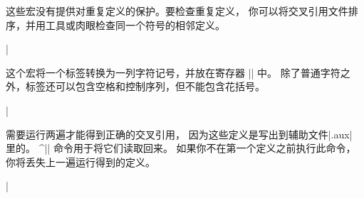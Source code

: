 {{%
这些宏没有提供对重复定义的保护。要检查重复定义，
你可以将交叉引用文件排序，并用工具或肉眼检查同一个符号的相邻定义。

\csdisplay
\newif\ifxrefwarning  \xrefwarningtrue
\def\xrdef#1{\begingroup
   \xrlabel{#1}%
   \edef\@wr{\@writexrdef{\the\@xrlabeltoks}}%
   \@wr
   \endgroup \ignorespaces}%
\def\@writexrdef#1{\write\reffile{%
     \string\gdef
        \expandafter\string\csname#1\endcsname
        {\noexpand\folio}\percentchar}}%
\def\xrefnumber#1{%
   \xrlabel{#1}%
   \toks0 =
      \expandafter{\csname\the\@xrlabeltoks\endcsname}%
   \expandafter \ifx\the\toks0\relax
      \ifxrefwarning \message{Undefined label
         `\tokstostring{#1}'.}\fi
      {\let\spacesub = \space
       \expandafter\xdef\the\toks0
          {`{\tt \tokstostring{#1}}'}}\fi
   \the\toks0}%
\def\xref#1{p.\thinspace\xrefnumber{#1}}%
\def\xrefn#1{\xrefnumber{#1}}%
|

这个宏将一个标签转换为一列字符记号，并放在寄存器 || 中。
除了普通字符之外，标签还可以包含空格和控制序列，但不能包含花括号。

\csdisplay
\newtoks\@xrlabeltoks
\def\xrlabel#1{\begingroup
      \escapechar = `\_ \edef\tts{\tokstostring{#1_}}%
      \global\@xrlabeltoks = \expandafter{\tts}%
   \endgroup}%
|

需要运行两遍才能得到正确的交叉引用，
因为这些定义是写出到辅助文件|\jobname.aux| 里的。
\pix^|\readreffile| 命令用于将它们读取回来。
如果你不在第一个定义之前执行此命令，你将丢失上一遍运行得到的定义。

\csdisplay
\newwrite{} \newif\ifreffileopened
\def\openreffile{\ifreffileopened\else
      \reffileopenedtrue
      \immediate\openout\reffile = \jobname.aux
   \fi}%
\def\readreffile{%
   \testfileexistence{aux}%
   \iffileexists
      \begingroup
         \@setletters
          \jobname.aux
      \endgroup
   \else
      \message{No cross-reference file; I won't give you
         warnings about undefined labels.}%
      \xrefwarningfalse
   \fi
   \openreffile}%
\def\@setletters{%
   \catcode`_ = \letter \catcode`+ = \letter
   \catcode`- = \letter \catcode`@ = \letter
   \catcode`0 = \letter \catcode`1 = \letter
   \catcode`2 = \letter \catcode`3 = \letter
   \catcode`4 = \letter \catcode`5 = \letter
   \catcode`6 = \letter \catcode`7 = \letter
   \catcode`8 = \letter \catcode`9 = \letter
   \catcode`( = \letter \catcode`) = \letter}%
|

}}
